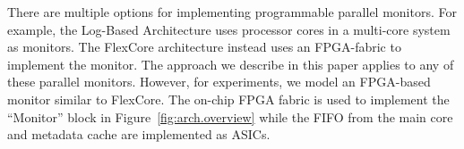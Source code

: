 There are multiple options for implementing programmable parallel monitors. For
example, the Log-Based Architecture \cite{lba-isca08} uses processor cores in a
multi-core system as monitors. The FlexCore architecture
\cite{flexcore-micro10} instead uses an FPGA-fabric to implement the
monitor. The approach we describe in this paper applies to any of these
parallel monitors. However, for experiments, we model an FPGA-based monitor
similar to FlexCore.  The on-chip FPGA fabric is used to implement the
``Monitor'' block in Figure~\ref{fig:arch.overview} while the FIFO from the
main core and metadata cache are implemented as ASICs.
